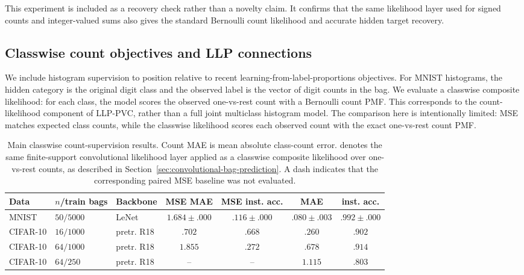 This experiment is included as a recovery check rather than a novelty claim.
It confirms that the same likelihood layer used for signed counts and integer-valued sums also gives the standard Bernoulli count likelihood and accurate hidden target recovery.

\subsection{Classwise count objectives and LLP connections}

We include histogram supervision to position \method{} relative to recent learning-from-label-proportions objectives.
For MNIST histograms, the hidden category is the original digit class and the observed label is the vector of digit counts in the bag.
We evaluate a classwise composite likelihood: for each class, the model scores the observed one-vs-rest count with a Bernoulli count PMF.
This corresponds to the count-likelihood component of LLP-PVC, rather than a full joint multiclass histogram model.
The comparison here is intentionally limited: MSE matches expected class counts, while the classwise \method{} likelihood scores each observed count with the exact one-vs-rest count PMF.

\begin{table}[t]
\centering
\scriptsize
\setlength{\tabcolsep}{4pt}
\caption{Main classwise count-supervision results.  Count MAE is mean absolute class-count error.  \method{} denotes the same finite-support convolutional likelihood layer applied as a classwise composite likelihood over one-vs-rest counts, as described in Section~\ref{sec:convolutional-bag-prediction}.  A dash indicates that the corresponding paired MSE baseline was not evaluated.}
\label{tab:histogram-llp-pvc}
\begin{tabular}{lllcccc}
\toprule
Data & $n$/train bags & Backbone & MSE MAE & MSE inst. acc. & \method{} MAE & \method{} inst. acc. \\
\midrule
MNIST & $50/5000$ & LeNet & $1.684{\pm}.000$ & $.116{\pm}.000$ & $.080{\pm}.003$ & $.992{\pm}.000$ \\
CIFAR-10 & $16/1000$ & pretr. R18 & $.702$ & $.668$ & $.260$ & $.902$ \\
CIFAR-10 & $64/1000$ & pretr. R18 & $1.855$ & $.272$ & $.678$ & $.914$ \\
CIFAR-10 & $64/250$ & pretr. R18 & -- & -- & $1.115$ & $.803$ \\
\bottomrule
\end{tabular}
\end{table}

